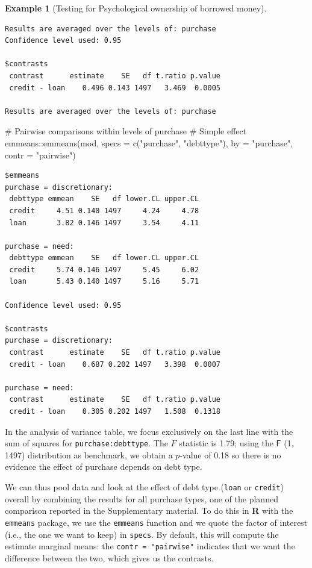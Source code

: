 \documentclass[
  11pt,
  letterpaper,
]{scrbook}
\newenvironment{Shaded}{\begin{snugshade}}{\end{snugshade}}
\newcommand{\AttributeTok}[1]{\textcolor[rgb]{0.40,0.45,0.13}{#1}}
\newcommand{\CommentTok}[1]{\textcolor[rgb]{0.37,0.37,0.37}{#1}}
\newcommand{\FunctionTok}[1]{\textcolor[rgb]{0.28,0.35,0.67}{#1}}
\newcommand{\NormalTok}[1]{\textcolor[rgb]{0.00,0.23,0.31}{#1}}
\newcommand{\SpecialCharTok}[1]{\textcolor[rgb]{0.37,0.37,0.37}{#1}}
\newcommand{\StringTok}[1]{\textcolor[rgb]{0.13,0.47,0.30}{#1}}
\theoremstyle{definition}
\theoremstyle{definition}
\newtheorem{example}{Example}[chapter]
\theoremstyle{remark}
\begin{document}
\begin{example}[Testing for Psychological ownership of borrowed
money]
\begin{verbatim}
Results are averaged over the levels of: purchase 
Confidence level used: 0.95 

$contrasts
 contrast      estimate    SE   df t.ratio p.value
 credit - loan    0.496 0.143 1497   3.469  0.0005

Results are averaged over the levels of: purchase 
\end{verbatim}

\begin{Shaded}
\begin{Highlighting}[]
\CommentTok{\# Pairwise comparisons within levels of purchase}
\CommentTok{\# Simple effect}
\NormalTok{emmeans}\SpecialCharTok{::}\FunctionTok{emmeans}\NormalTok{(mod, }
                 \AttributeTok{specs =} \FunctionTok{c}\NormalTok{(}\StringTok{"purchase"}\NormalTok{, }\StringTok{"debttype"}\NormalTok{),}
                 \AttributeTok{by =} \StringTok{"purchase"}\NormalTok{,}
                 \AttributeTok{contr =} \StringTok{"pairwise"}\NormalTok{)}
\end{Highlighting}
\end{Shaded}

\begin{verbatim}
$emmeans
purchase = discretionary:
 debttype emmean    SE   df lower.CL upper.CL
 credit     4.51 0.140 1497     4.24     4.78
 loan       3.82 0.146 1497     3.54     4.11

purchase = need:
 debttype emmean    SE   df lower.CL upper.CL
 credit     5.74 0.146 1497     5.45     6.02
 loan       5.43 0.140 1497     5.16     5.71

Confidence level used: 0.95 

$contrasts
purchase = discretionary:
 contrast      estimate    SE   df t.ratio p.value
 credit - loan    0.687 0.202 1497   3.398  0.0007

purchase = need:
 contrast      estimate    SE   df t.ratio p.value
 credit - loan    0.305 0.202 1497   1.508  0.1318
\end{verbatim}

In the analysis of variance table, we focus exclusively on the last line
with the sum of squares for \texttt{purchase:debttype}. The \(F\)
statistic is 1.79; using the \(\mathsf{F}\) (1, 1497) distribution as
benchmark, we obtain a \(p\)-value of 0.18 so there is no evidence the
effect of purchase depends on debt type.

We can thus pool data and look at the effect of debt type (\texttt{loan}
or \texttt{credit}) overall by combining the results for all purchase
types, one of the planned comparison reported in the Supplementary
material. To do this in \textbf{R} with the \texttt{emmeans} package, we
use the \texttt{emmeans} function and we quote the factor of interest
(i.e., the one we want to keep) in \texttt{specs}. By default, this will
compute the estimate marginal means: the \texttt{contr\ =\ "pairwise"}
indicates that we want the difference between the two, which gives us
the contrasts.


\end{example}
\end{document}
